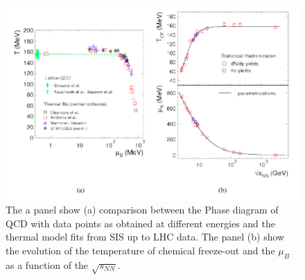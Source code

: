 \documentclass[12pt,a4paper]{book}
\begin{document}
\begin{figure}
\begin{minipage}{0.45\textwidth}
			\label{fig:particle_abbundance}
		\end{minipage}
		\centering
		\includegraphics[width=0.8 \linewidth]{pictures/shm_qcd_comparison.png}
		\caption{ The a panel show (a) comparison between the Phase diagram of QCD with data points as obtained at different energies and the thermal model fits from SIS up to LHC data. The panel (b) show the evolution of the temperature of chemical freeze-out and the $\mu_B$ as a function of the $\sqrt{s_{NN}}$.\cite{Andronic_2017}}
		\label{fig:shm_qcd_comparison}
		
	\end{figure}
	
\end{document}
